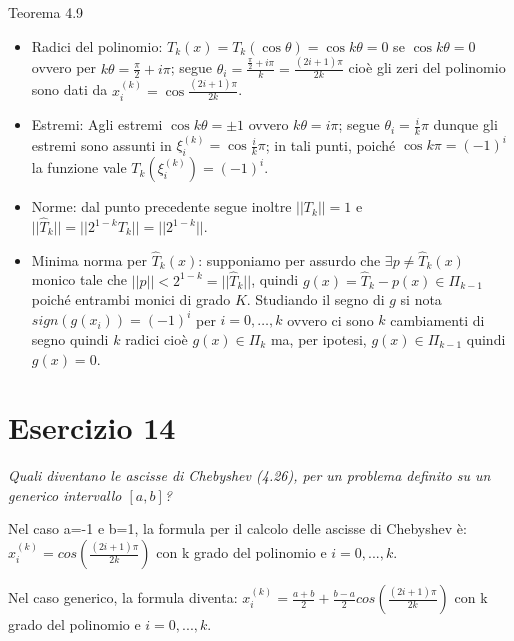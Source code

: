 \begin{sol}
\begin{enumerate}
\begin{itemize}
	\end{itemize}
	\end{enumerate}
	Teorema 4.9
	\begin{itemize}
		\item Radici del polinomio: $T_k(x)=T_k(\cos{\theta})=\cos{k\theta}=0$ se $\cos{k\theta}=0$ ovvero per $k\theta=\frac{\pi}{2}+i\pi$; segue $\theta_i=\frac{\frac{\pi}{2}+i\pi}{k}=\frac{(2i+1)\pi}{2k}$ cioè gli zeri del polinomio sono dati da $x_i^{(k)}=\cos{\frac{(2i+1)\pi}{2k}}$.
		\item Estremi: Agli estremi $\cos{k\theta}=\pm 1$ ovvero $k\theta=i\pi$; segue $\theta_i=\frac{i}{k}\pi$ dunque gli estremi sono assunti in $\xi_i^{(k)}=\cos{\frac{i}{k}\pi}$; in tali punti, poiché $\cos{k\pi}=(-1)^i$ la funzione vale $T_k(\xi_i^{(k)})=(-1)^i$.
		\item Norme: dal punto precedente segue inoltre $||T_k||=1$ e  $||\hat{T}_k||=||2^{1-k}T_k||=||2^{1-k}||$.
		\item Minima norma per $\hat{T}_k(x)$: supponiamo per assurdo che $\exists p\neq\hat{T}_k(x)$ monico tale che $||p||<2^{1-k}=||\hat{T}_k||$, quindi $g(x)=\hat{T}_k-p(x)\in\Pi_{k-1}$ poiché entrambi monici di grado $K$. Studiando il segno di $g$ si nota $sign(g(x_i))=(-1)^i$ per $i=0,\ldots,k$ ovvero ci sono $k$ cambiamenti di segno quindi $k$ radici cioè $g(x)\in\Pi_k$ ma, per ipotesi, $g(x)\in\Pi_{k-1}$ quindi $g(x)=0$.
	\end{itemize}
\end{sol}


\section{Esercizio 14}
\label{sub:Esercizio 14}
\emph{Quali diventano le ascisse di Chebyshev (4.26), per un problema definito su un generico intervallo $[a,b]$?}
\begin{sol}
	Nel caso a=-1 e b=1, la formula per il calcolo delle ascisse di Chebyshev è:
	$x_{i}^{(k)}=cos(\frac{(2i+1)\pi}{2k})$  con k grado del polinomio e $i=0,...,k$.

	Nel caso generico, la formula diventa:
	$x_{i}^{(k)}=\frac{a+b}{2}+\frac{b-a}{2}cos(\frac{(2i+1)\pi}{2k})$  con k grado del polinomio e $i=0,...,k$.
\end{sol}


